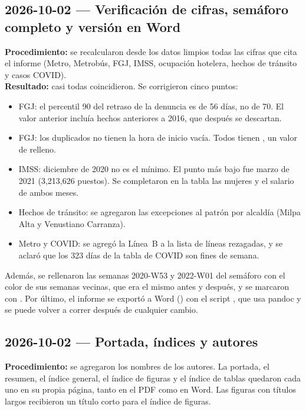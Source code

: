 \subsection{2026-10-02 --- Verificación de cifras, semáforo completo y versión en Word}
\textbf{Procedimiento:} se recalcularon desde los datos limpios todas las cifras que cita el informe
(Metro, Metrobús, FGJ, IMSS, ocupación hotelera, hechos de tránsito y casos COVID).\\
\textbf{Resultado:} casi todas coincidieron. Se corrigieron cinco puntos:
\begin{itemize}
  \item FGJ: el percentil 90 del retraso de la denuncia es de 56 días, no de 70. El valor anterior
        incluía hechos anteriores a 2016, que después se descartan.
  \item FGJ: los duplicados no tienen la hora de inicio vacía. Todos tienen , un
        valor de relleno.
  \item IMSS: diciembre de 2020 no es el mínimo. El punto más bajo fue marzo de 2021 (3,213,626
        puestos). Se completaron en la tabla las mujeres y el salario de ambos meses.
  \item Hechos de tránsito: se agregaron las excepciones al patrón por alcaldía (Milpa Alta y
        Venustiano Carranza).
  \item Metro y COVID: se agregó la Línea~B a la lista de líneas rezagadas, y se aclaró que los 323
        días de la tabla de COVID son fines de semana.
\end{itemize}
Además, se rellenaron las semanas 2020-W53 y 2022-W01 del semáforo con el color de sus semanas
vecinas, que era el mismo antes y después, y se marcaron con . Por último, el informe
se exportó a Word () con el script , que usa
pandoc y se puede volver a correr después de cualquier cambio.

\subsection{2026-10-02 --- Portada, índices y autores}
\textbf{Procedimiento:} se agregaron los nombres de los autores. La portada, el resumen, el índice
general, el índice de figuras y el índice de tablas quedaron cada uno en su propia página, tanto en el
PDF como en Word. Las figuras con títulos largos recibieron un título corto para el índice de figuras.
